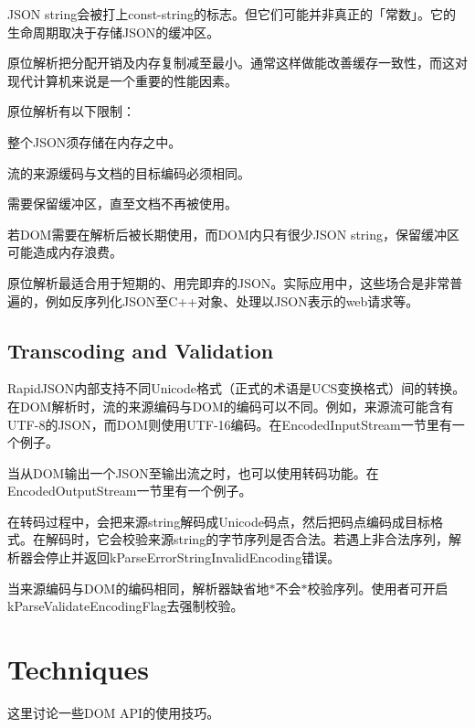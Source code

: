 J\+S\+ON string会被打上const-\/string的标志。但它们可能并非真正的「常数」。它的生命周期取决于存储\+J\+S\+O\+N的缓冲区。

原位解析把分配开销及内存复制减至最小。通常这样做能改善缓存一致性，而这对现代计算机来说是一个重要的性能因素。

原位解析有以下限制：


\begin{DoxyEnumerate}
\item 整个\+J\+S\+O\+N须存储在内存之中。
\item 流的来源缓码与文档的目标编码必须相同。
\item 需要保留缓冲区，直至文档不再被使用。
\item 若\+D\+O\+M需要在解析后被长期使用，而\+D\+O\+M内只有很少\+J\+S\+ON string，保留缓冲区可能造成内存浪费。
\end{DoxyEnumerate}

原位解析最适合用于短期的、用完即弃的\+J\+S\+O\+N。实际应用中，这些场合是非常普遍的，例如反序列化\+J\+S\+O\+N至\+C++对象、处理以\+J\+S\+O\+N表示的web请求等。\hypertarget{md_Cadriciel_Commun_Externe_RapidJSON_doc_dom.zh-cn_TranscodingAndValidation}{}\subsection{Transcoding and Validation}\label{md_Cadriciel_Commun_Externe_RapidJSON_doc_dom.zh-cn_TranscodingAndValidation}
Rapid\+J\+S\+O\+N内部支持不同\+Unicode格式（正式的术语是\+U\+C\+S变换格式）间的转换。在\+D\+O\+M解析时，流的来源编码与\+D\+O\+M的编码可以不同。例如，来源流可能含有\+U\+T\+F-\/8的\+J\+S\+O\+N，而\+D\+O\+M则使用\+U\+T\+F-\/16编码。在Encoded\+Input\+Stream一节里有一个例子。

当从\+D\+O\+M输出一个\+J\+S\+O\+N至输出流之时，也可以使用转码功能。在Encoded\+Output\+Stream一节里有一个例子。

在转码过程中，会把来源string解码成\+Unicode码点，然后把码点编码成目标格式。在解码时，它会校验来源string的字节序列是否合法。若遇上非合法序列，解析器会停止并返回{\ttfamily k\+Parse\+Error\+String\+Invalid\+Encoding}错误。

当来源编码与\+D\+O\+M的编码相同，解析器缺省地$\ast$不会$\ast$校验序列。使用者可开启{\ttfamily k\+Parse\+Validate\+Encoding\+Flag}去强制校验。\hypertarget{md_Cadriciel_Commun_Externe_RapidJSON_doc_sax.zh-cn_Techniques}{}\section{Techniques}\label{md_Cadriciel_Commun_Externe_RapidJSON_doc_sax.zh-cn_Techniques}
这里讨论一些\+D\+OM A\+P\+I的使用技巧。

